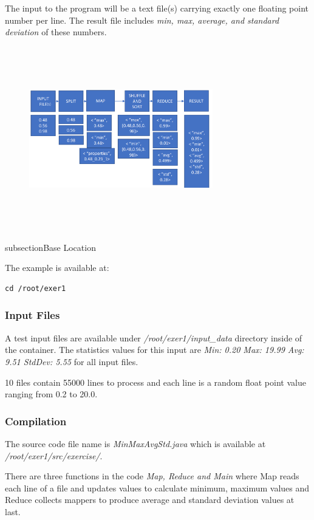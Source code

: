 The input to the program will be a text file(s) carrying exactly one
floating point number per line. The result file includes \textit{min,
  max, average, and standard deviation} of these numbers.


  \begin{figure}[!htbp]
    \includegraphics[width=8cm,height=8cm]{section/container/exer1.png}
    \centering
  \end{figure}

\sub subsection{Base Location}

The example is available at:

\begin{lstlisting}
cd /root/exer1
\end{lstlisting}

\subsubsection{Input Files}

A test input files are available under \textit{/root/exer1/input_data}
directory inside of the container.  The statistics values for this
input are \textit{Min: 0.20 Max: 19.99 Avg: 9.51 StdDev: 5.55} for all
input files.

10 files contain 55000 lines to process and each line is a random
float point value ranging from 0.2 to 20.0.

\subsubsection{Compilation}

The source code file name is \textit{MinMaxAvgStd.java} which is
available at \textit{/root/exer1/src/exercise/}.

There are three functions in the code \textit{Map, Reduce and Main}
where Map reads each line of a file and updates values to calculate
minimum, maximum values and Reduce collects mappers to produce average
and standard deviation values at last.


